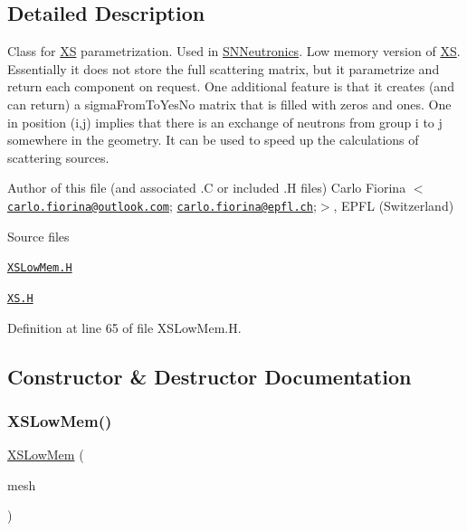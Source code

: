\subsection{Detailed Description}
Class for \hyperlink{classFoam_1_1XS}{XS} parametrization. Used in \hyperlink{classFoam_1_1SNNeutronics}{S\+N\+Neutronics}. Low memory version of \hyperlink{classFoam_1_1XS}{XS}. Essentially it does not store the full scattering matrix, but it parametrize and return each component on request. One additional feature is that it creates (and can return) a sigma\+From\+To\+Yes\+No matrix that is filled with zeros and ones. One in position (i,j) implies that there is an exchange of neutrons from group i to j somewhere in the geometry. It can be used to speed up the calculations of scattering sources. 

\label{_Description}%
 Author of this file (and associated .C or included .H files) Carlo Fiorina $<$\href{mailto:carlo.fiorina@outlook.com}{\tt carlo.\+fiorina@outlook.\+com}; \href{mailto:carlo.fiorina@epfl.ch}{\tt carlo.\+fiorina@epfl.\+ch};$>$, E\+P\+FL (Switzerland)

\begin{DoxyParagraph}{Source files}

\begin{DoxyItemize}
\item \href{../../../home/carlo/data/GeN-Foam/GeN-Foam_ffn/GeN-Foam/GeN-Foam/classes/neutronics/XS/XSLowMem/XSLowMem.H}{\tt X\+S\+Low\+Mem.\+H} 
\item \href{../../../home/carlo/data/GeN-Foam/GeN-Foam_ffn/GeN-Foam/GeN-Foam/classes/neutronics/XS/XSLowMem/XS.H}{\tt X\+S.\+H} 
\end{DoxyItemize}
\end{DoxyParagraph}


Definition at line 65 of file X\+S\+Low\+Mem.\+H.



\subsection{Constructor \& Destructor Documentation}
\mbox{\label{classFoam_1_1XSLowMem_a4b6969c39c49dc09d5252c1b06ea6623}} 
\subsubsection{\texorpdfstring{X\+S\+Low\+Mem()}{XSLowMem()}}
{\footnotesize\ttfamily \hyperlink{classFoam_1_1XSLowMem}{X\+S\+Low\+Mem} (\begin{DoxyParamCaption}\item[{const fv\+Mesh \&}]{mesh }\end{DoxyParamCaption})}



